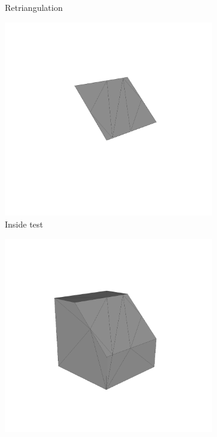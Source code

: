 \begin{figure}
\begin{subfigure}[t]{0.3\textwidth}
		\caption{Retriangulation}
		\label{fig:cube2_retriangulated}
	\end{subfigure}
	\begin{subfigure}[t]{0.3\textwidth}
		\centering
		\includegraphics[width=\textwidth]{images/cube2_eliminated}
		\caption{Inside test}
		\label{fig:cube2_eliminated}
	\end{subfigure}
	\begin{subfigure}[t]{0.3\textwidth}
		\centering
		\includegraphics[width=\textwidth]{images/cube2_result}

\end{subfigure}
\end{figure}
